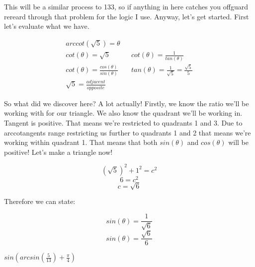 \documentclass[10pt,letterpaper]{amspset}
\begin{document}
\begin{solution}
    This will be a similar process to 133, so if anything in here catches you offguard rereard through that problem for the logic I use. Anyway, let's get started. First let's evaluate what we have.
    
    \begin{align}
        arccot(\sqrt{5}) = \theta \\
        cot(\theta) = \sqrt{5} && cot(\theta) = \frac{1}{tan(\theta)}\\
        cot(\theta) = \frac{cos(\theta)}{sin(\theta)} && tan(\theta) = \frac{1}{\sqrt{5}} = \frac{\sqrt{5}}{5} \\
        \sqrt{5} = \frac{adjacent}{opposite}
    \end{align}
    
    So what did we discover here? A lot actually! Firstly, we know the ratio we'll be working with for our triangle. We also know the quadrant we'll be working in. Tangent is positive. That means we're restricted to quadrants 1 and 3. Due to arccotangents range restricting us further to quadrants 1 and 2 that means we're working within quadrant 1. That means that both $sin(\theta)$ and $cos(\theta)$ will be positive! Let's make a triangle now! 
    

    \[ (\sqrt{5})^2 + 1^2 = c^2\]
    \[ 6 = c^2\]
    \[ c = \sqrt{6} \]

    Therefore we can state: 

    \[ sin(\theta) = \frac{1}{\sqrt{6}}\]
    \[\boxed{ sin(\theta) = \frac{\sqrt{6}}{6} }\]
\end{solution}


\pagebreak


\begin{problem}[155]
    $sin \left( arcsin \left( \frac{5}{13} \right) + \frac{\pi}{4} \right)$    
\end{problem}
\end{document}
